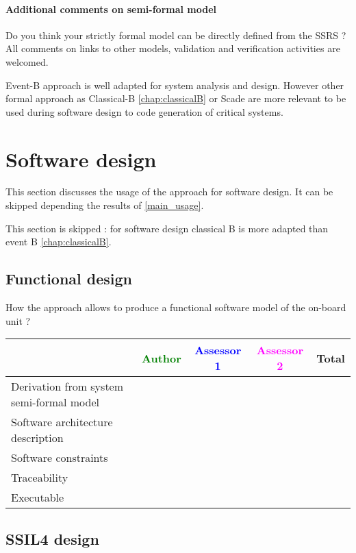 \paragraph{Additional comments on semi-formal  model} Do you think your strictly formal  model can be directly defined from the SSRS ?
All comments on links to  other models, validation and verification activities are welcomed.


\begin{author_comment}
Event-B  approach is well adapted for system analysis and design. However other formal approach as Classical-B \ref{chap:classicalB} or Scade are more relevant to be used during software design to code generation of critical systems.
\end{author_comment}


\section{Software design}
This section discusses the usage of the approach for software design.
It can be skipped depending the results of \ref{main_usage}.


\begin{author_comment}
This section is skipped :  for software design classical B is more adapted than event B \ref{chap:classicalB}.
\end{author_comment}


\subsection{Functional design}


How the approach allows to  produce a functional software model of the on-board unit ?

\begin{tabular}{|l | c | c | c | c|}
\hline
& \textcolor{green}{Author} & \textcolor{blue}{Assessor 1} & \textcolor{magenta}{Assessor 2} & Total \\
\hline
Derivation from system semi-formal model  & & & &  \\
\hline 
Software architecture description  & & & &  \\
\hline
Software constraints  & & & &  \\
\hline
Traceability  & & & &  \\
\hline
Executable  & & & &  \\
\hline
\end{tabular}

\subsection{SSIL4 design}

